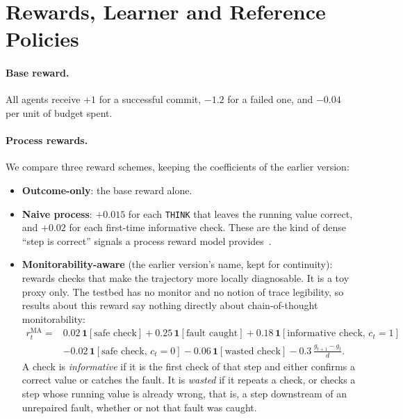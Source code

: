 \section{Rewards, Learner and Reference Policies}
\label{sec:method}

\paragraph{Base reward.}
All agents receive $+1$ for a successful commit, $-1.2$ for a failed one, and $-0.04$ per unit of budget spent.

\paragraph{Process rewards.}
We compare three reward schemes, keeping the coefficients of the earlier version:
\begin{itemize}
  \item \textbf{Outcome-only}: the base reward alone.
  \item \textbf{Naive process}: $+0.015$ for each \texttt{THINK} that leaves the running value correct, and $+0.02$ for each first-time informative check. These are the kind of dense ``step is correct'' signals a process reward model provides~\citep{uesato2022process,lightman2024verify}.
  \item \textbf{Monitorability-aware} (the earlier version's name, kept for continuity): rewards checks that make the trajectory more locally diagnosable. It is a toy proxy only. The testbed has no monitor and no notion of trace legibility, so results about this reward say nothing directly about chain-of-thought monitorability:
\begin{equation}
\begin{aligned}
r^{\mathrm{MA}}_t = {}& 0.02\,\mathbf{1}[\text{safe check}] + 0.25\,\mathbf{1}[\text{fault caught}] + 0.18\,\mathbf{1}[\text{informative check},\,c_t{=}1] \\
& - 0.02\,\mathbf{1}[\text{safe check},\,c_t{=}0] - 0.06\,\mathbf{1}[\text{wasted check}] - 0.3\,\frac{g_{t+1}-g_t}{d}.
\end{aligned}
\label{eq:ma}
\end{equation}
A check is \emph{informative} if it is the first check of that step and either confirms a correct value or catches the fault. It is \emph{wasted} if it repeats a check, or checks a step whose running value is already wrong, that is, a step downstream of an unrepaired fault, whether or not that fault was caught.
\end{itemize}
